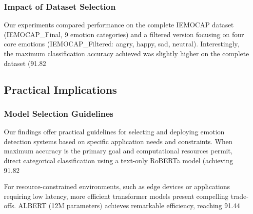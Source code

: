 \documentclass[12pt]{article}
\begin{document}
\subsubsection{Impact of Dataset Selection}
Our experiments compared performance on the complete IEMOCAP dataset (IEMOCAP\_Final, 9 emotion categories) and a filtered version focusing on four core emotions (IEMOCAP\_Filtered: angry, happy, sad, neutral). Interestingly, the maximum classification accuracy achieved was slightly higher on the complete dataset (91.82%

\subsection{Practical Implications}
\subsubsection{Model Selection Guidelines}
Our findings offer practical guidelines for selecting and deploying emotion detection systems based on specific application needs and constraints. When maximum accuracy is the primary goal and computational resources permit, direct categorical classification using a text-only RoBERTa model (achieving 91.82%

For resource-constrained environments, such as edge devices or applications requiring low latency, more efficient transformer models present compelling trade-offs. ALBERT (12M parameters) achieves remarkable efficiency, reaching 91.44%
\end{document}
